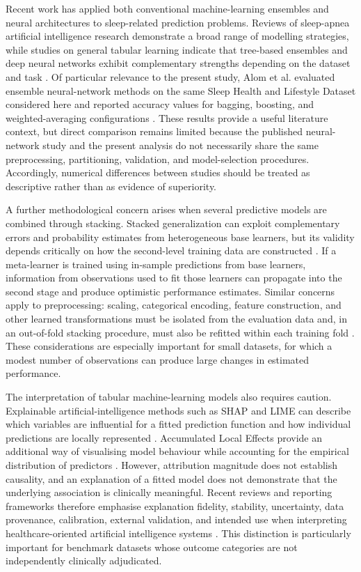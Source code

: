 \documentclass[a4paper,fleqn]{cas-dc}
\begin{document}
Recent work has applied both conventional machine-learning ensembles and neural architectures to sleep-related prediction problems. Reviews of sleep-apnea artificial intelligence research demonstrate a broad range of modelling strategies, while studies on general tabular learning indicate that tree-based ensembles and deep neural networks exhibit complementary strengths depending on the dataset and task \cite{bazoukis2023,tyagi2023,abdalrazaq2024,borisov2024}. Of particular relevance to the present study, Alom et al. evaluated ensemble neural-network methods on the same Sleep Health and Lifestyle Dataset considered here and reported accuracy values for bagging, boosting, and weighted-averaging configurations \cite{alom2024}. These results provide a useful literature context, but direct comparison remains limited because the published neural-network study and the present analysis do not necessarily share the same preprocessing, partitioning, validation, and model-selection procedures. Accordingly, numerical differences between studies should be treated as descriptive rather than as evidence of superiority.

A further methodological concern arises when several predictive models are combined through stacking. Stacked generalization can exploit complementary errors and probability estimates from heterogeneous base learners, but its validity depends critically on how the second-level training data are constructed \cite{wolpert1992}. If a meta-learner is trained using in-sample predictions from base learners, information from observations used to fit those learners can propagate into the second stage and produce optimistic performance estimates. Similar concerns apply to preprocessing: scaling, categorical encoding, feature construction, and other learned transformations must be isolated from the evaluation data and, in an out-of-fold stacking procedure, must also be refitted within each training fold \cite{kapoor2023,efthimiou2024,collins2024}. These considerations are especially important for small datasets, for which a modest number of observations can produce large changes in estimated performance.

The interpretation of tabular machine-learning models also requires caution. Explainable artificial-intelligence methods such as SHAP and LIME can describe which variables are influential for a fitted prediction function and how individual predictions are locally represented \cite{lundberg2017,ribeiro2016,instanceshap2023}. Accumulated Local Effects provide an additional way of visualising model behaviour while accounting for the empirical distribution of predictors \cite{apley2020}. However, attribution magnitude does not establish causality, and an explanation of a fitted model does not demonstrate that the underlying association is clinically meaningful. Recent reviews and reporting frameworks therefore emphasise explanation fidelity, stability, uncertainty, data provenance, calibration, external validation, and intended use when interpreting healthcare-oriented artificial intelligence systems \cite{jung2023,allen2024,tripodai2024,futureai2025}. This distinction is particularly important for benchmark datasets whose outcome categories are not independently clinically adjudicated.
\end{document}
